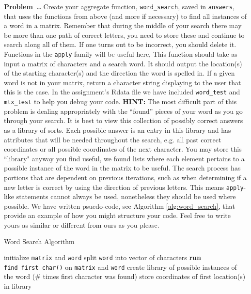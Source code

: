 \documentclass[11pt]{article}
\newcounter{prob} %
\newenvironment{prob}[1][]{\refstepcounter{prob}\par\noindent\smallskip
   \textbf{Problem~\thesection .\theprob. #1} \rmfamily}{\smallskip}
\begin{document}
\begin{prob}
Create your aggregate function, \texttt{word\_search}, saved in \texttt{answers}, that uses the functions from above (and more if necessary) to find all instances of a word in a matrix. Remember that during the middle of your search there may be more than one path of correct letters, you need to store these and continue to search along all of them. If one turns out to be incorrect, you should delete it. Functions in the \texttt{apply} family will be useful here, This function should take as input a matrix of characters and a search word. It should output the location(s) of the starting character(s) and the direction the word is spelled in. If a given word is not in your matrix, return a character string displaying to the user that this is the case. In the assignment's Rdata file we have included \texttt{word\_test} and \texttt{mtx\_test} to help you debug your code.
\newline
\textbf{HINT:} The most difficult part of this problem is dealing appropriately with the ``found'' pieces of your word as you go through your search. It is best to view this collection of possibly correct answers as a library of sorts. Each possible answer is an entry in this library and has attributes that will be needed throughout the search, e.g. all past correct coordinates or all possible coordinates of the next character. You may store this ``library" anyway you find useful, we found lists where each element pertains to a possible instance of the word in the matrix to be useful. The search process has portions that are dependent on previous iterations, such as when determining if a new letter is correct by using the direction of previous letters. This means \texttt{apply}-like statements cannot always be used, nonetheless they should be used where possible. We have written psuedo-code, see Algorithm  \ref{alg:word_search}, that provide an example of how you might structure your code. Feel free to write yours as similar or different from ours as you please.
\begin{algorithm}[H]
\caption{Word Search Algorithm}
\label{alg:word_search}
\begin{algorithmic}[1]
 \State initialize \texttt{matrix} and \texttt{word}
 \State split \texttt{word} into  vector of characters
 \State \textbf{run} \texttt{find\_first\_char()} on \texttt{matrix} and \texttt{word}
 \State create library of possible instances of the word (\# times first character was found)
 \State store coordinates of first location(s) in library

\end{algorithmic}
\end{algorithm}
\end{prob}
\end{document}
